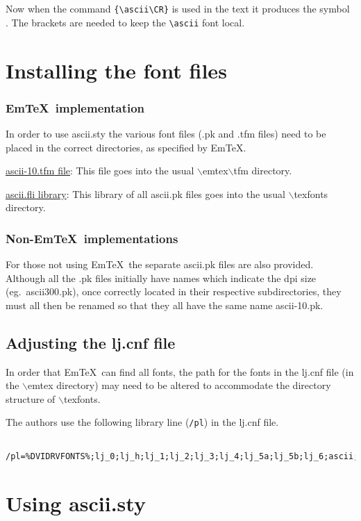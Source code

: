 Now when the command \verb!{\ascii\CR}! is used in the text it produces the
symbol {\ascii\CR}. The brackets are needed to keep the \verb!\ascii!
font local.


\section{Installing the font files}
\subsubsection*{Em\TeX\ implementation}

In order to use {\sc ascii.sty} the various font files ({\sc .pk} and
{\sc.tfm} files) need to be placed in the correct directories, as specified by Em\TeX.

\underline{{\sc ascii-10.tfm} file}: This file goes into
the usual $\backslash${\sc emtex}$\backslash${\sc tfm} directory.

\underline{{\sc ascii.fli} library}: This library of all {\sc ascii.pk} files goes into
the usual $\backslash${\sc texfonts} directory.

\subsubsection*{Non-Em\TeX\ implementations}
For those not using Em\TeX\, the separate {\sc ascii.pk} files are also
provided.
Although all the {\sc .pk} files initially have names which indicate the
dpi size (eg.\ {\sc ascii300.pk}), once correctly located in their respective subdirectories, they must all then
be renamed so that they all have the same name {\sc ascii-10.pk}.


\subsection{Adjusting the {\sc lj.cnf} file}

In order that Em\TeX\ can find all  fonts, the path for the fonts
in the {\sc lj.cnf} file (in the $\backslash${\sc emtex} directory)
may need to be altered to accommodate the directory structure of
$\backslash${\sc texfonts}.

The authors use the following library line (\verb!/pl!) in the {\sc lj.cnf} file.
\begin{verbatim}
  /pl=%DVIDRVFONTS%;lj_0;lj_h;lj_1;lj_2;lj_3;lj_4;lj_5a;lj_5b;lj_6;ascii;
\end{verbatim}

\section{Using {\sc ascii.sty}}

